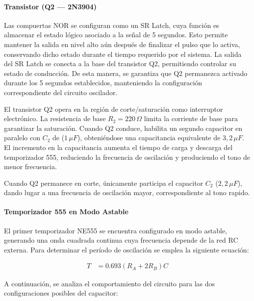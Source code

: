 \documentclass[journal, onecolumn]{IEEEtran}
\begin{document}
 
\paragraph{Transistor (Q2 — 2N3904)}

Las compuertas NOR se configuran como un SR Latch, cuya función es
almacenar el estado lógico asociado a la señal de 5 segundos. Esto permite
mantener la salida en nivel alto aún después de finalizar el pulso que lo activa,
conservando dicho estado durante el tiempo requerido por el sistema.
La salida del SR Latch se conecta a la base del transistor Q2,
permitiendo controlar su estado de conducción. De esta manera, se garantiza
que Q2 permanezca activado durante los 5 segundos establecidos, manteniendo
la configuración correspondiente del circuito oscilador.

El transistor Q2 opera en la región de corte/saturación como interruptor
electrónico. La resistencia de base $R_2=220\,\Omega$ limita la corriente
de base para garantizar la saturación. Cuando Q2 conduce, habilita un
segundo capacitor en paralelo con $C_2$ de ($1\,\mu F$), obteniéndose una
capacitancia equivalente de $3{,}2\,\mu F$. El incremento en la capacitancia
aumenta el tiempo de carga y descarga del temporizador 555, reduciendo la
frecuencia de oscilación y produciendo el tono de menor frecuencia.

Cuando Q2 permanece en corte, únicamente participa el capacitor
$C_2$ ($2{,}2\,\mu F$), dando lugar a una frecuencia de oscilación mayor,
correspondiente al tono rapido.
 
\paragraph{Temporizador 555 en Modo Astable}
 
El primer temporizador NE555 se encuentra configurado en modo astable, generando una
onda cuadrada continua cuya frecuencia depende de la red RC externa.
Para determinar el período de oscilación se emplea la siguiente ecuación:

\begin{align}
T &= 0.693(R_A + 2R_B)C
\label{eq:periodo}
\end{align}

A continuación, se analiza el comportamiento del circuito para las dos
configuraciones posibles del capacitor:
\end{document}
